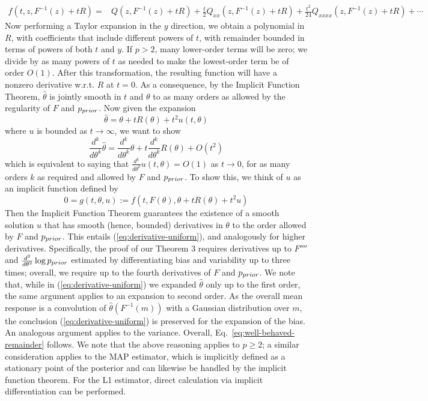 \begin{align*}
f(t,z,F^{-1}(z) + t R)=& Q(z,F^{-1}(z) + t R) + \frac{t}{2} Q_{xx}(z,F^{-1}(z) + t R) + \frac{t^2}{24} Q_{xxxx}(z,F^{-1}(z) + t R)+\cdots 
\end{align*}
Now performing a Taylor expansion in the $y$ direction, we obtain a polynomial in $R$, with coefficients that include different powers of $t$, with remainder bounded in terms of powers of both $t$ and $y$.
If $p>2$, many lower-order terms will be zero; we divide by as many powers of $t$ as needed to make the lowest-order term be of order $O(1)$.
After this transformation, the resulting function will have a nonzero derivative w.r.t. $R$ at $t=0$.
As a consequence, by the Implicit Function Theorem, $\widehat{\theta}$ is jointly smooth in $t$ and $\theta$ to as many orders as allowed by the regularity of $F$ and $p_{prior}$. 
Now given the expansion
\begin{equation}
    \widehat{\theta} = \theta + t R(\theta) + t^2 u(t,\theta)
\end{equation}
where $u$ is bounded as $t \rightarrow \infty$, we want to show
\begin{equation}\label{eq:derivative-uniform}
    \frac{d^k}{d\theta^k} \widehat{\theta} = \frac{d^k}{d\theta^k} \theta + t \frac{d^k}{d\theta^k}R(\theta) + O(t^2)
\end{equation}
which is equivalent to saying that $\frac{d^k}{d\theta^k} u(t,\theta) = O(1)$ as $t\rightarrow 0$, for as many orders $k$ as required and allowed by $F$ and $p_{prior}$.
To show this, we think of $u$ as an implicit function defined by
\begin{equation}
    0 = g(t,\theta, u) := f(t,F(\theta), \theta + t R(\theta) + t^2 u)
\end{equation}
Then the Implicit Function Theorem guarantees the existence of a smooth solution $u$ that has smooth (hence, bounded) derivatives in $\theta$ to the order allowed by $F$ and $p_{prior}$. This entails (\ref{eq:derivative-uniform}), and analogously for higher derivatives.
Specifically, the proof of our Theorem 3 requires derivatives up to $F''''$ and $\frac{d^2}{d\theta^2} \log p_{prior}$ estimated by differentiating bias and variability up to three times; overall, we require up to the fourth derivatives of $F$ and $p_{prior}$.  
We note that, while in (\ref{eq:derivative-uniform}) we expanded $\widehat{\theta}$ only up to the first order, the same argument applies to an expansion to second order.
As the overall mean response is a convolution of $\widehat{\theta}(F^{-1}(m))$ with a Gaussian distribution over $m$, the conclusion (\ref{eq:derivative-uniform}) is preserved for the expansion of the bias.
An analogous argument applies to the variance.
Overall, Eq.~\ref{eq:well-behaved-remainder} follows.
We note that the above reasoning applies to $p \geq 2$; a similar consideration applies to the MAP estimator, which is implicitly defined as a stationary point of the posterior and can likewise be handled by the implicit function theorem. For the L1 estimator, direct calculation via implicit differentiation can be performed.




